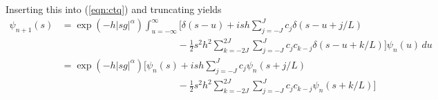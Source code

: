 \documentclass[11pt,letterpaper]{article}
\begin{document}
Inserting this into (\ref{eqn:ctq}) and truncating yields
\begin{align*}
 \psi_{n+1}(s) &=  \exp{\left(  -h |s g|^{\alpha} \right)} \int_{u=-\infty}^{\infty} \biggl[ \delta(s-u) + i s h \sum_{j=-J}^J c_j \delta(s - u + j/L) \\ 
 & \qquad \qquad \qquad \qquad \qquad \qquad - \frac{1}{2} s^2 h^2 \sum_{k=-2J}^{2J} \sum_{j=-J}^J c_j c_{k-j}  \delta(s - u + k/L) \biggr]
 \psi_{n}(u) \, du \\
 &= \exp{\left(  -h |s g|^{\alpha} \right)} \biggl[ \psi_n(s) + i s h \sum_{j=-J}^J c_j \psi_n(s+j/L) \\
 & \qquad \qquad \qquad \qquad \qquad \qquad- \frac{1}{2} s^2 h^2 \sum_{k=-2J}^{2J} \sum_{j=-J}^J c_j c_{k-j} \psi_n(s+k/L) \biggr]
\end{align*}


\end{document}
